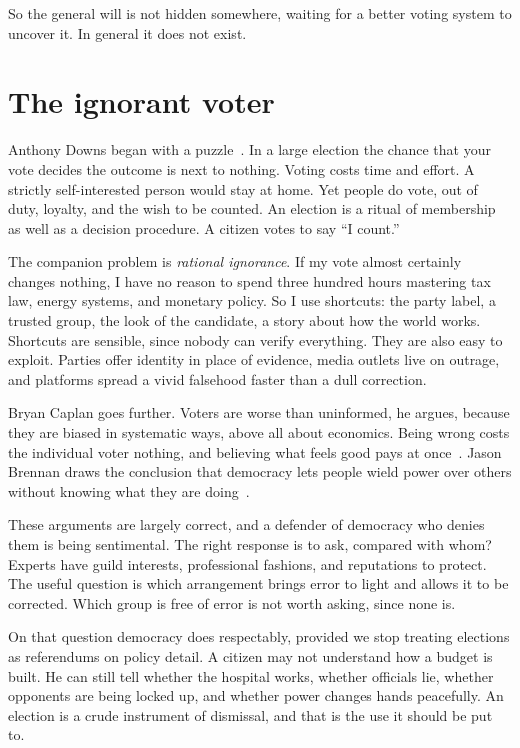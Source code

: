 \documentclass[12pt,a4paper]{book}
\begin{document}
So the general will is not hidden somewhere, waiting for a better voting system to uncover it. In general it does not exist.

\section{The ignorant voter}

Anthony Downs began with a puzzle~\cite{Downs1957}. In a large election the chance that your vote decides the outcome is next to nothing. Voting costs time and effort. A strictly self-interested person would stay at home. Yet people do vote, out of duty, loyalty, and the wish to be counted. An election is a ritual of membership as well as a decision procedure. A citizen votes to say ``I count.''

The companion problem is \emph{rational ignorance}. If my vote almost certainly changes nothing, I have no reason to spend three hundred hours mastering tax law, energy systems, and monetary policy. So I use shortcuts: the party label, a trusted group, the look of the candidate, a story about how the world works. Shortcuts are sensible, since nobody can verify everything. They are also easy to exploit. Parties offer identity in place of evidence, media outlets live on outrage, and platforms spread a vivid falsehood faster than a dull correction.

Bryan Caplan goes further. Voters are worse than uninformed, he argues, because they are biased in systematic ways, above all about economics. Being wrong costs the individual voter nothing, and believing what feels good pays at once~\cite{Caplan2007}. Jason Brennan draws the conclusion that democracy lets people wield power over others without knowing what they are doing~\cite{Brennan2016}.

These arguments are largely correct, and a defender of democracy who denies them is being sentimental. The right response is to ask, compared with whom? Experts have guild interests, professional fashions, and reputations to protect. The useful question is which arrangement brings error to light and allows it to be corrected. Which group is free of error is not worth asking, since none is.

On that question democracy does respectably, provided we stop treating elections as referendums on policy detail. A citizen may not understand how a budget is built. He can still tell whether the hospital works, whether officials lie, whether opponents are being locked up, and whether power changes hands peacefully. An election is a crude instrument of dismissal, and that is the use it should be put to.
\end{document}
